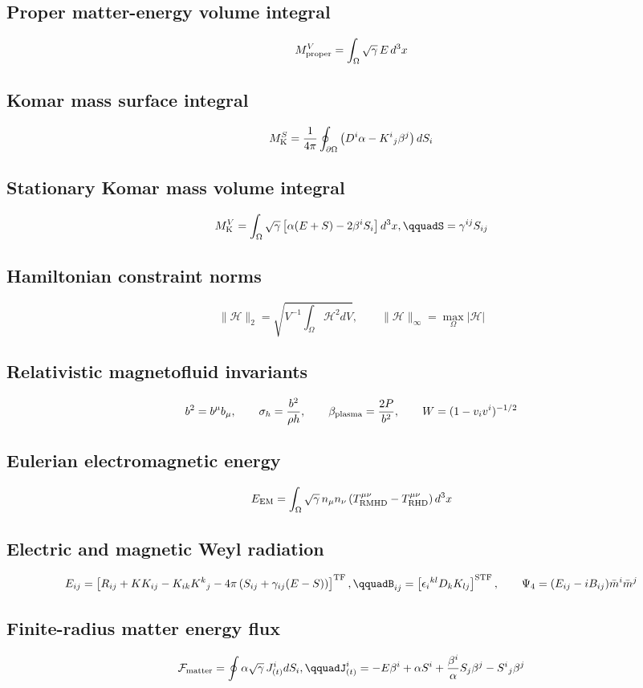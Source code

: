 \documentclass[11pt]{article}
\begin{document}
\subsection*{Proper matter-energy volume integral}
\[
M_{\rm proper}^{V}=\int_\Omega\sqrt{\gamma}\,E\,d^3x
\]
\subsection*{Komar mass surface integral}
\[
M_{\rm K}^{S}=\frac{1}{4\pi}\oint_{\partial\Omega}\left(D^i\alpha-K^i{}_j\beta^j\right)dS_i
\]
\subsection*{Stationary Komar mass volume integral}
\[
M_{\rm K}^{V}=\int_\Omega\sqrt{\gamma}\left[\alpha(E+S)-2\beta^iS_i\right]d^3x,\qquadS=\gamma^{ij}S_{ij}
\]
\subsection*{Hamiltonian constraint norms}
\[
\|\mathcal H\|_2=\sqrt{V^{-1}\int_\Omega\mathcal H^2dV},\qquad\|\mathcal H\|_\infty=\max_\Omega|\mathcal H|
\]
\subsection*{Relativistic magnetofluid invariants}
\[
b^2=b^\mu b_\mu,\qquad \sigma_h=\frac{b^2}{\rho h},\qquad\beta_{\rm plasma}=\frac{2P}{b^2},\qquad W=(1-v_iv^i)^{-1/2}
\]
\subsection*{Eulerian electromagnetic energy}
\[
E_{\rm EM}=\int_\Omega\sqrt{\gamma}\,n_\mu n_\nu\left(T_{\rm RMHD}^{\mu\nu}-T_{\rm RHD}^{\mu\nu}\right)d^3x
\]
\subsection*{Electric and magnetic Weyl radiation}
\[
E_{ij}=\left[R_{ij}+KK_{ij}-K_{ik}K^k{}_j-4\pi\left(S_{ij}+\gamma_{ij}(E-S)\right)\right]^{\rm TF},\qquadB_{ij}=\left[\epsilon_i{}^{kl}D_kK_{lj}\right]^{\rm STF},\qquad\Psi_4=(E_{ij}-iB_{ij})\bar m^i\bar m^j
\]
\subsection*{Finite-radius matter energy flux}
\[
\mathcal F_{\rm matter}=\oint \alpha\sqrt{\gamma}\,J^i_{(t)}dS_i,\qquadJ^i_{(t)}=-E\beta^i+\alpha S^i+\frac{\beta^i}{\alpha}S_j\beta^j-S^i{}_j\beta^j
\]
\end{document}
